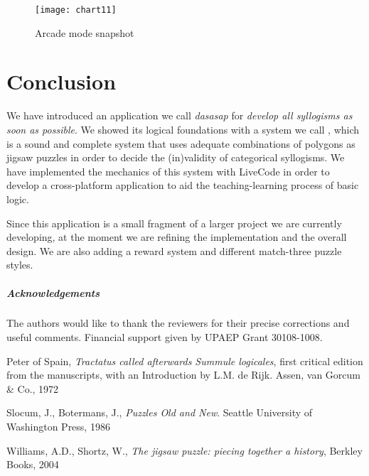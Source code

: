 \documentclass[a4paper,UKenglish]{lipics}
\begin{document}
\begin{figure}[h]
  \texttt{[image: chart11]}
  \caption{Arcade mode snapshot}  
  \label{fig:13}
\end{figure}



\section{Conclusion}
\label{sec:3}
We have introduced an application we call \textit{dasasap} for \textit{develop all syllogisms as soon as possible}. We showed its logical foundations with a system we call , which is a sound and complete system that uses adequate combinations of polygons as jigsaw puzzles in order to decide the (in)validity of categorical syllogisms. We have implemented the mechanics of this system with LiveCode in order to develop a cross-platform application to aid the teaching-learning process of basic logic. 

Since this application is a small fragment of a larger project we are currently developing, at the moment we are refining the implementation and the overall design. We are also adding a reward system and different match-three puzzle styles.    

\subparagraph*{Acknowledgements}
The authors would like to thank the reviewers for their precise corrections and useful comments. Financial support given by UPAEP Grant 30108-1008.












\begin{thebibliography}{50}
Peter of Spain, \textit{Tractatus called afterwards Summule logicales}, first critical edition from the manuscripts, with an Introduction by L.M. de Rijk. Assen, van Gorcum \& Co., 1972

Slocum, J., Botermans, J., \textit{Puzzles Old and New}. Seattle University of Washington Press, 1986

Williams, A.D., Shortz, W., \textit{The jigsaw puzzle: piecing together a history}, Berkley Books, 2004

\end{thebibliography}
\end{document}
